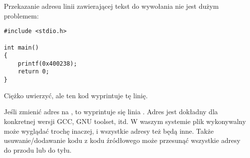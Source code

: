 Przekazanie adresu linii zawierającej tekst  do wywołania  nie jest dużym problemem:

\begin{lstlisting}[style=customc]
#include <stdio.h>

int main()
{
    printf(0x400238);
    return 0;
}
\end{lstlisting}

Ciężko uwierzyć, ale ten kod wyprintuje tę linię.

Jeśli zmienić adres na , to wyprintuje się linia .
Adres jest dokładny dla konkretnej wersji GCC, GNU toolset, itd.
W waszym systemie plik wykonywalny może wyglądać trochę inaczej, i wszystkie adresy też będą inne.
Także usuwanie/dodawanie kodu z kodu źródłowego może przesunąć wszystkie adresy do przodu lub do tyłu.


